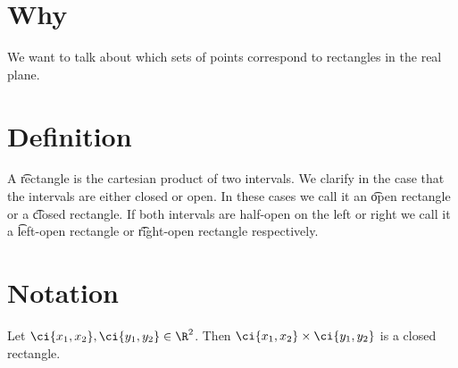 

\section*{Why}

We want to talk about which sets of points correspond to rectangles in the real plane.

\section*{Definition}

A \t{rectangle} is the cartesian product of two intervals.
We clarify in the case that the intervals are either closed or open.
In these cases we call it an \t{open rectangle} or a \t{closed rectangle}.
If both intervals are half-open on the left or right we call it a \t{left-open rectangle} or \t{right-open rectangle} respectively.

\section*{Notation}

Let $\ci{x_1, x_2},\ci{y_1,y_2}\in\R ^2$.
Then $\ci{x_1, x_2} \times  \ci{y_1,y_2}$ is a closed rectangle.

\blankpage
